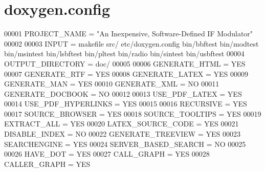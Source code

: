 \hypertarget{doxygen_8config_source}{\section{doxygen.\+config}
\label{doxygen_8config_source}
}

\begin{DoxyCode}
00001 PROJECT\_NAME = "An Inexpensive, Software-Defined IF Modulator"
00002 
00003 INPUT = makefile src/ etc/doxygen.config bin/bbftest bin/modtest bin/msintest bin/lsbftest bin/pltest
       bin/radio bin/sintest bin/usbftest
00004 OUTPUT\_DIRECTORY = doc/
00005 
00006 GENERATE\_HTML = YES
00007 GENERATE\_RTF = YES
00008 GENERATE\_LATEX = YES
00009 GENERATE\_MAN = YES
00010 GENERATE\_XML = NO
00011 GENERATE\_DOCBOOK = NO
00012 
00013 USE\_PDF\_LATEX = YES
00014 USE\_PDF\_HYPERLINKS = YES
00015 
00016 RECURSIVE = YES
00017 SOURCE\_BROWSER = YES
00018 SOURCE\_TOOLTIPS = YES
00019 EXTRACT\_ALL = YES
00020 LATEX\_SOURCE\_CODE = YES
00021 DISABLE\_INDEX = NO
00022 GENERATE\_TREEVIEW = YES
00023 SEARCHENGINE = YES
00024 SERVER\_BASED\_SEARCH = NO
00025 
00026 HAVE\_DOT = YES
00027 CALL\_GRAPH = YES
00028 CALLER\_GRAPH = YES
\end{DoxyCode}
